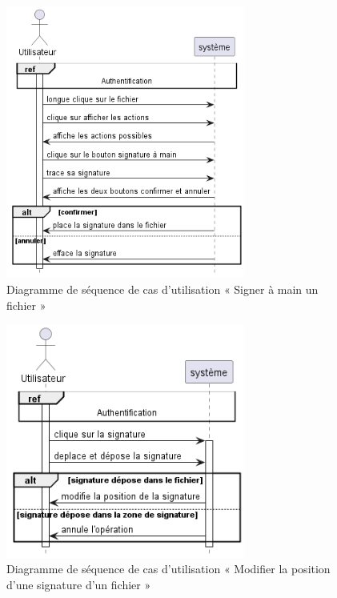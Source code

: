 \begin{figure}[H]
  \centering
  \includegraphics[width=0.7\textwidth]{out/diagrams/sprint4/sign_by_hand/sign_by_hand}
  \caption{Diagramme de séquence de cas d'utilisation « Signer à main un fichier   »}
  \label{fig:sequence_sign_by_hand}
\end{figure}
\begin{figure}[H]
  \centering
  \includegraphics[width=0.7\textwidth]{out/diagrams/sprint4/move_signature/move_signature}
  \caption{Diagramme de séquence de cas d'utilisation « Modifier la position d'une signature d'un fichier »}
  \label{fig:sequence_move_signature}
\end{figure}


